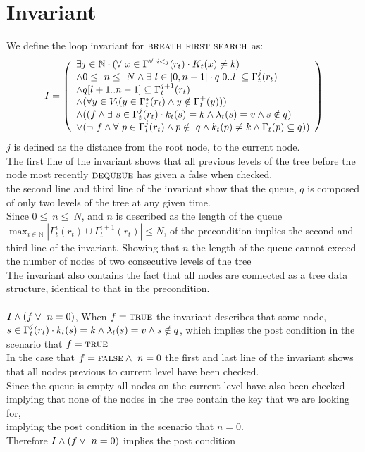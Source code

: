 \documentclass[headings=small,a4paper,12pt]{scrartcl}
\newcommand{\bfs}{\textsc{breath first search}\xspace}
\newcommand{\deq}{\textsc{dequeue}\xspace}
\begin{document}
\section{Invariant}
\label{sec:invariant}
\text We define the loop invariant for $\bfs$ as:\\
\begin{align*}
    &I = \left(
    \begin{array}{l}
         \exists j\in \mathbb{N}\cdot{}(\forall~x \in \Gamma^{\forall~i<j}(r_t)\cdot{}K_t(x) \ne k)\\
         \wedge 0\leq~n\leq~N\wedge \exists~l\in[0,n-1] \cdot{}q[0..l] \subseteq \Gamma^j_t(r_t)\\
         \wedge q[l+1..n-1] \subseteq \Gamma^{j+1}_t(r_t)\\
         \wedge (\forall y\in V_t(y\in \Gamma^{*}_{t}(r_t)\wedge y \notin\Gamma^{+}_{t}(y)))\\
         \wedge ((f\wedge\exists~s\in \Gamma^{j}_{t}(r_t)\cdot{}k_t(s) = k\wedge \lambda_t(s) = v\wedge s\notin q)\\
         \vee (\neg~f \wedge \forall~p \in \Gamma^j_t(r_t) \wedge p\notin~q \wedge k_t(p) \ne k \wedge \Gamma_t(p) \subseteq q))
    \end{array}
    \right)\\
\end{align*}
$j$ is defined as the distance from the root node, to the current node.
\\
The first line of the invariant shows that all previous levels of the tree before the node most recently $\deq$ has given a false when checked.\\
the second line and third line of the invariant show that the queue, $q$ is composed of only two levels of the tree at any given time.\\
Since $0\leq~n\leq~N$, and $n$ is described as the length of the queue\\ $\max_{i\in\mathbb{N}}|\Gamma_t^{i}(r_t)\cup\Gamma_{t}^{i+1}(r_t)|\leq N$, of the precondition implies the second and third line of the invariant. Showing that $n$ the length of the queue cannot exceed the number of nodes of two consecutive levels of the tree\\
The invariant also contains the fact that all nodes are connected as a tree data structure, identical to that in the precondition.\\
\\
$I\wedge(f\vee~n=0)$, When $f=\text{\textsc{true}}$ the invariant describes that some node,\\ $s\in\Gamma^j_t(r_t)\cdot{}k_t(s) = k\wedge \lambda_t(s) = v\wedge s\notin q$, which implies the post condition in the scenario that $f = \text{\textsc{true}}$\\
In the case that $f=\text{\textsc{false}}\wedge~n=0$ the first and last line of the invariant shows that all nodes previous to current level have been checked.\\ Since the queue is empty all nodes on the current level have also been checked implying that none of the nodes in the tree contain the key that we are looking for,\\ implying the post condition in the scenario that $n=0$.\\
Therefore $I\wedge(f\vee~n=0)$ implies the post condition\\
\break
\end{document}
